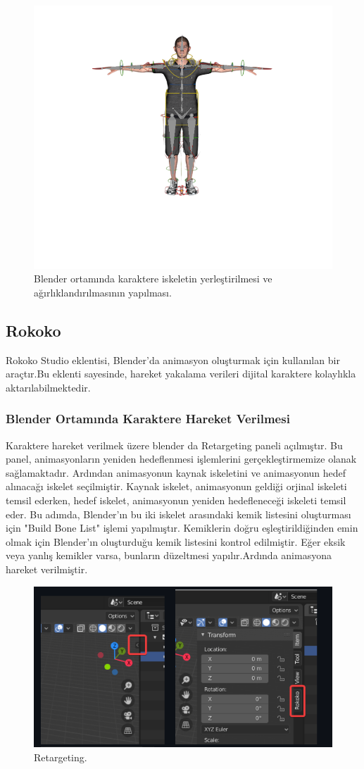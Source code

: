 \documentclass[12pt, a4paper]{article}
\begin{document}
\begin{figure}[h]
	\centering
	\includegraphics[width= 15 cm, height = 9 cm]{iskelet-Photoroom.png}
	\caption{Blender ortamında karaktere iskeletin yerleştirilmesi ve ağırlıklandırılmasının yapılması.}
	
\end{figure}

\subsection{Rokoko}
Rokoko Studio eklentisi, Blender'da animasyon oluşturmak için kullanılan bir araçtır.Bu eklenti sayesinde, hareket yakalama verileri dijital karaktere kolaylıkla aktarılabilmektedir.\cite{chatgpt}

\subsubsection{Blender Ortamında Karaktere Hareket Verilmesi}
Karaktere hareket verilmek üzere blender da Retargeting paneli açılmıştır.
Bu panel, animasyonların yeniden hedeflenmesi işlemlerini gerçekleştirmemize olanak sağlamaktadır. Ardından animasyonun kaynak iskeletini ve animasyonun hedef alınacağı iskelet seçilmiştir. Kaynak iskelet, animasyonun geldiği orjinal iskeleti temsil ederken, hedef iskelet, animasyonun yeniden hedefleneceği iskeleti temsil eder. Bu adımda, Blender'ın bu iki iskelet arasındaki kemik listesini oluşturması için "Build Bone List" işlemi yapılmıştır. Kemiklerin doğru eşleştirildiğinden emin olmak için Blender'ın oluşturduğu kemik listesini kontrol edilmiştir. Eğer eksik veya yanlış kemikler varsa, bunların düzeltmesi yapılır.Ardında animasyona hareket verilmiştir.
\begin{figure}[h]
	\centering
	\includegraphics[width= 7 cm , height= 5 cm]{rokoko1.png}
	\caption{Retargeting.}
\end{figure}
\end{document}
